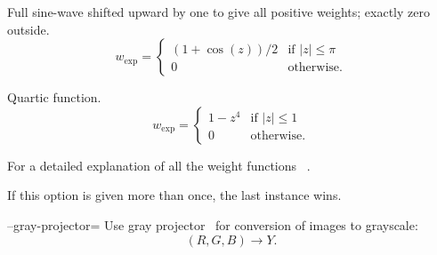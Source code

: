 \begin{codelist}
\begin{table}
\begin{codelist}
    \item[\itempar{fullsine \\ full-sine}]\itemend
      Full sine-wave shifted upward by one to give all positive weights; exactly zero outside.
      \begin{equation}\label{equ:weight:fullsine}
      w_{\mathrm{exp}} =
      \left\{\begin{array}{cl}
      (1 + \cos(z)) / 2 & \mbox{if } |z| \leq \pi \\
      0                 & \mbox{otherwise.}
      \end{array} \right.
      \end{equation}

    \item[\itempar{bisquare \\ bi-square}]\itemend
      Quartic function.
      \begin{equation}\label{equ:weight:bisquare}
      w_{\mathrm{exp}} =
      \left\{
      \begin{array}{cl}
        1 - z^4 & \mbox{if } |z| \leq 1 \\
        0       & \mbox{otherwise.}
      \end{array}
      \right.
      \end{equation}
    \end{codelist}

    \caption[Exposure weight functions]{\label{tab:exposure-weight-functions}%
      Predefined exposure weight functions.  For a graphical comparison see
      \figureName~\ref{fig:exposure-weights}.}
  \end{table}

  For a detailed explanation of all the weight functions
  \sectionName~.

  If this option is given more than once, the last instance wins.


  \label{opt:gray-projector}%
\item[--gray-projector=\metavar{PROJECTOR}]\itemend
  Use gray projector~ for conversion of  images to grayscale:
  \[
  (R, G, B) \rightarrow Y.
  \]


\end{codelist}
